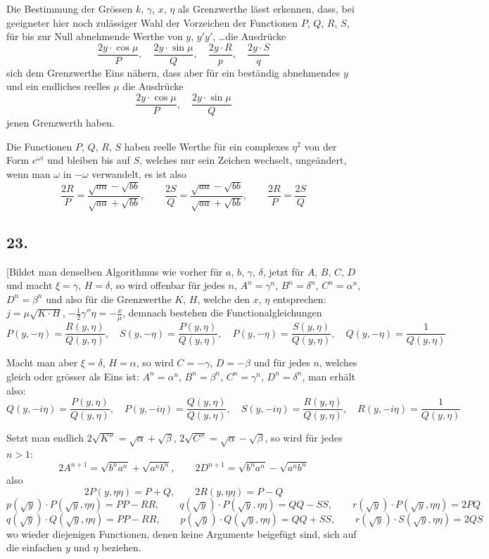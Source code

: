 \documentclass[10pt,a4paper]{article}
\begin{document}
Die Bestimmung der Grössen $k$, $\gamma$, $x$, $\eta$ als Grenzwerthe lässt erkennen,
dass, bei geeigneter hier noch zulässiger Wahl der Vorzeichen der Functionen
$P$, $Q$, $R$, $S$, für bis zur Null abnehmende Werthe von $y$, $y'y'$, \ldots die Ausdrücke
\[
\frac{2y\cdot\cos\mu}{P}, \quad \frac{2y\cdot\sin\mu}{Q}, \quad \frac{2y\cdot R}{p}, \quad \frac{2y\cdot S}{q}
\]
sich dem Grenzwerthe Eins nähern, dass aber für ein beständig abnehmendes $y$
und ein endliches reelles $\mu$ die Ausdrücke
\[
\frac{2y\cdot\cos\mu}{P}, \quad \frac{2y\cdot\sin\mu}{Q}
\]
jenen Grenzwerth haben.

Die Functionen $P$, $Q$, $R$, $S$ haben reelle Werthe für ein complexes $\eta^2$
von der Form $e^{\omega i}$ und bleiben bis auf $S$, welches nur sein Zeichen wechselt,
ungeändert, wenn man $\omega$ in $-\omega$ verwandelt, es ist also
\[
\frac{2R}{P} = \frac{\sqrt{aa}-\sqrt{bb}}{\sqrt{aa}+\sqrt{bb}}, \qquad
\frac{2S}{Q} = \frac{\sqrt{aa}-\sqrt{bb}}{\sqrt{aa}+\sqrt{bb}}, \qquad
\frac{2R}{P} = \frac{2S}{Q}
\]


\subsection*{23.}

[Bildet man denselben Algorithmus wie vorher für $a$, $b$, $\gamma$, $\delta$, jetzt für
$A$, $B$, $C$, $D$ und macht $\xi=\gamma$, $H=\delta$, so wird offenbar für jedes $n$, $A^n=\gamma^n$,
$B^n=\delta^n$, $C^n=\alpha^n$, $D^n=\beta^n$ und also für die Grenzwerthe $K$, $H$, welche den
$x$, $\eta$ entsprechen: $j=\mu\sqrt{K\cdot H}$, $-\frac12\gamma''\eta=-\frac{x}{\mu}$, demnach bestehen die Functionalgleichungen
\[
P(y,-\eta) = \frac{R(y,\eta)}{Q(y,\eta)}, \quad
S(y,-\eta) = \frac{P(y,\eta)}{Q(y,\eta)}, \quad
P(y,-\eta) = \frac{S(y,\eta)}{Q(y,\eta)}, \quad
Q(y,-\eta) = \frac{1}{Q(y,\eta)}
\]

Macht man aber $\xi=\delta$, $H=\alpha$, so wird $C=-\gamma$, $D=-\beta$ und für
jedes $n$, welches gleich oder grösser als Eins ist: $A^n=\alpha^n$, $B^n=\beta^n$, $C^n=\gamma^n$,
$D^n=\delta^n$, man erhält also:
\[
Q(y,-i\eta) = \frac{P(y,\eta)}{Q(y,\eta)}, \quad
P(y,-i\eta) = \frac{Q(y,\eta)}{Q(y,\eta)}, \quad
S(y,-i\eta) = \frac{R(y,\eta)}{Q(y,\eta)}, \quad
R(y,-i\eta) = \frac{1}{Q(y,\eta)}
\]

Setzt man endlich $2\sqrt{K''}=\sqrt{\alpha}+\sqrt{\beta}$, $2\sqrt{C''}=\sqrt{\alpha}-\sqrt{\beta}$, so wird für jedes $n>1$:
\[
2A^{n+1} = \sqrt{b^n a^n} + \sqrt{a^n b^n}, \qquad
2D^{n+1} = \sqrt{b^n a^n} - \sqrt{a^n b^n}
\]
also
\[
2P(y,\eta\eta) = P+Q, \qquad 2R(y,\eta\eta) = P-Q
\]
\[
p(\sqrt{y})\cdot P(\sqrt{y},\eta\eta) = PP-RR, \qquad
q(\sqrt{y})\cdot P(\sqrt{y},\eta\eta) = QQ-SS, \qquad
r(\sqrt{y})\cdot P(\sqrt{y},\eta\eta) = 2PQ
\]
\[
q(\sqrt{y})\cdot Q(\sqrt{y},\eta\eta) = PP-RR, \qquad
p(\sqrt{y})\cdot Q(\sqrt{y},\eta\eta) = QQ+SS, \qquad
r(\sqrt{y})\cdot S(\sqrt{y},\eta\eta) = 2QS
\]
wo wieder diejenigen Functionen, denen keine Argumente beigefügt sind, sich
auf die einfachen $y$ und $\eta$ beziehen.
\end{document}

